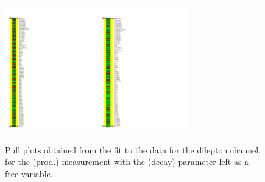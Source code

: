 \begin{figure}[ht]
  \centering
  \includegraphics[width=0.35\textwidth]{figures/diff_xsec/dilep_tty_prod_mu_blinded/compare_NP_pulls/compare_NP_dilep_fits_pt_ptj1_ptll/NuisPar_comp.pdf}
  \quad \quad 
  \includegraphics[width=0.35\textwidth]{figures/diff_xsec/dilep_tty_prod_mu_blinded/compare_NP_pulls/compare_NP_dilep_fits_dr_dr1_dr2/NuisPar_comp.pdf}
  \caption{Pull plots obtained from the fit to the data for the dilepton channel, for the \tty (prod.) measurement
  with the \tty (decay) parameter left as a free variable.}
  \label{fig:pull_plot_pt_tty_dec_free_dilep_mu_blinded_1}
\end{figure}
\FloatBarrier

